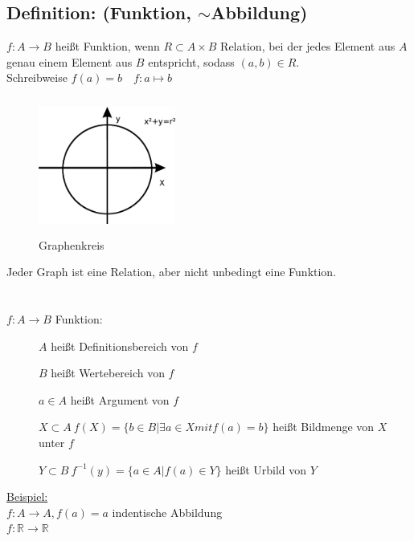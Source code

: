 \subsection{Definition: (Funktion,  $\sim$Abbildung)}
$f: A \rightarrow B$ heißt Funktion, wenn $R\subset A\times B$ Relation, bei der jedes Element aus $A$ genau einem Element aus $B$ entspricht, sodass $(a,b)\in R$.\\
Schreibweise $f(a)=b \quad f:a\mapsto b$\\
%
\begin{figure} [H]
	\centering 
	\includegraphics[width=4.5cm, height=4.5cm]{mainmatter/chapter0/pics/graphenkreis.png}
	\caption{Graphenkreis} 
\end{figure}
Jeder Graph ist eine Relation, aber nicht unbedingt eine Funktion.\\
\qquad\\
\qquad\\
%
$f: A\rightarrow B$ Funktion:
\begin{description}
	\item [] $A$ heißt Definitionsbereich von $f$
	\item [] $B$ heißt Wertebereich von $f$
	\item [] $a \in A$ heißt Argument von $f$
	\item [] $X \subset A ~ f(X)=\{b \in B|\exists a \in X mit f(a)=b\}$ heißt Bildmenge 
		von	$X$ unter $f$
	\item [] $Y\subset B ~ f^{-1}(y)=\{a \in A| f(a) \in Y\}$ heißt Urbild von $Y$
\end{description}
\underline{Beispiel: }\\
$f: A \rightarrow A , f(a) = a$ indentische Abbildung\\
$f: \mathbb{R} \rightarrow \mathbb{R}$
%
%
%
